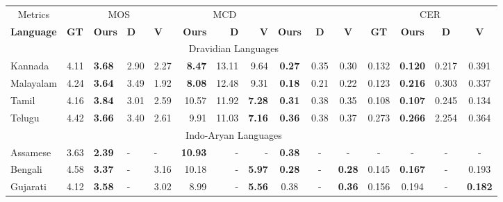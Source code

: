 \documentclass{article}
\begin{document}
\begin{table*}[ht]
\centering
\begingroup
\setlength{\tabcolsep}{6pt} \renewcommand{\arraystretch}{0.8} \begin{tabular}{@{}lllllrrrccccccc@{}}
\toprule
\multicolumn{1}{c}{Metrics} & \multicolumn{4}{c}{MOS}                               & \multicolumn{3}{c}{MCD}                                    & \multicolumn{3}{c}{}                                    & \multicolumn{4}{c}{CER}             \\ 
\cmidrule(l){1-1} \cmidrule(l){2-5} \cmidrule(l){6-8} \cmidrule(l){9-11} \cmidrule(l){12-14} 
\textbf{Language}                    & \textbf{GT} & \textbf{Ours} & \textbf{D} & \textbf{V} & \textbf{Ours}  & \textbf{D} & \textbf{V}                            & \textbf{Ours} & \textbf{D} & \textbf{V}                           & \textbf{GT} & \textbf{Ours}  & \textbf{D} & \textbf{V}     \\
\midrule
\multicolumn{14}{c}{Dravidian Languages}                           \\
\midrule
Kannada    & 4.11 & \textbf{3.68} & 2.90 & 2.27 & \textbf{8.47}  & 13.11 & 9.64          & \textbf{0.27} & 0.35 & 0.30         & 0.132 & \textbf{0.120} & 0.217 & 0.391          \\
Malayalam  & 4.24 & \textbf{3.64} & 3.49 & 1.92 & \textbf{8.08}  & 12.48 & 9.31          & \textbf{0.18} & 0.21 & 0.22         & 0.123 & \textbf{0.216} & 0.303 & 0.337          \\
Tamil      & 4.16 & \textbf{3.84} & 3.01 & 2.59 & 10.57          & 11.92 & \textbf{7.28} & \textbf{0.31} & 0.38 & 0.35         & 0.108 & \textbf{0.107} & 0.245 & 0.134          \\
Telugu     & 4.42 & \textbf{3.66} & 3.40 & 2.61 & 9.91           & 11.03 & \textbf{7.16} & \textbf{0.36} & 0.38 & 0.37         & 0.273 & \textbf{0.266} & 2.254 & 0.364          \\
\midrule
\multicolumn{14}{c}{Indo-Aryan Languages}                                                                           \\ 
\midrule
Assamese   & 3.63 & \textbf{2.39} & -    & -    & \textbf{10.93} & -     & -             & \textbf{0.38} & -    & -            & - & -              & -     & -              \\
Bengali    & 4.58 & \textbf{3.37} & -    & 3.16 & 10.18          & -     & \textbf{5.97} & \textbf{0.28} & -    & \textbf{0.28} & 0.145 & \textbf{0.167} & -     & 0.193          \\
Gujarati   & 4.12 & \textbf{3.58} & -    & 3.02 & 8.99           & -     & \textbf{5.56} & 0.38          & -    & \textbf{0.36} & 0.156 & 0.194          & -     & \textbf{0.182} \\

\end{tabular}
\end{table*}
\end{document}
